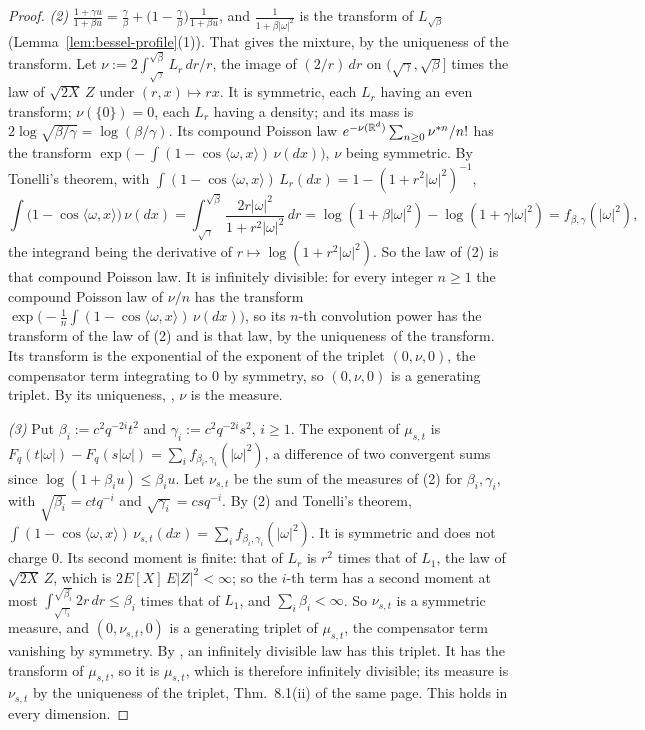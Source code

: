 \begin{proof}
\emph{(2)} $\frac{1 + \gamma u}{1 + \beta u} = \frac\gamma\beta + \bigl(1 - \frac\gamma\beta\bigr)
\frac{1}{1 + \beta u}$, and $\frac{1}{1 + \beta|\omega|^2}$ is the transform of $L_{\sqrt\beta}$
(Lemma~\ref{lem:bessel-profile}(1)). That gives the mixture, by the uniqueness of the transform.
Let $\nu := 2\int_{\sqrt\gamma}^{\sqrt\beta}L_r\,dr/r$, the image of $(2/r)\,dr$ on
$(\sqrt\gamma, \sqrt\beta]$ times the law of $\sqrt{2X}\,Z$ under $(r, x) \mapsto rx$. It is symmetric,
each $L_r$ having an even transform; $\nu(\{0\}) = 0$, each $L_r$ having a density; and its mass is
$2\log\sqrt{\beta/\gamma} = \log(\beta/\gamma)$. Its compound Poisson law
$e^{-\nu(\mathbb{R}^d)}\sum_{n \ge 0}\nu^{*n}/n!$ has the transform
$\exp\bigl(-\int(1 - \cos\langle\omega, x\rangle)\,\nu(dx)\bigr)$, $\nu$ being symmetric. By
Tonelli's theorem, with $\int(1 - \cos\langle\omega, x\rangle)\,L_r(dx) = 1 - (1 + r^2|\omega|^2)^{-1}$,
\[
  \int\bigl(1 - \cos\langle\omega, x\rangle\bigr)\,\nu(dx)
   = \int_{\sqrt\gamma}^{\sqrt\beta}\frac{2r|\omega|^2}{1 + r^2|\omega|^2}\,dr
   = \log(1 + \beta|\omega|^2) - \log(1 + \gamma|\omega|^2) = f_{\beta,\gamma}(|\omega|^2) ,
\]
the integrand being the derivative of $r \mapsto \log(1 + r^2|\omega|^2)$. So the law of (2) is that
compound Poisson law. It is infinitely divisible: for every integer $n \ge 1$ the compound Poisson
law of $\nu/n$ has the transform $\exp\bigl(-\tfrac1n\int(1 - \cos\langle\omega, x\rangle)\,
\nu(dx)\bigr)$, so its $n$-th convolution power has the transform of the law of (2) and is that
law, by the uniqueness of the transform. Its transform is the exponential of the exponent of the triplet $(0, \nu, 0)$,
the compensator term integrating to $0$ by symmetry, so $(0, \nu, 0)$ is a generating triplet. By
its uniqueness, , $\nu$ is the \Levy{}
measure.

\emph{(3)} Put $\beta_i := c^2q^{-2i}t^2$ and $\gamma_i := c^2q^{-2i}s^2$, $i \ge 1$. The exponent of
$\mu_{s,t}$ is $F_q(t|\omega|) - F_q(s|\omega|) = \sum_if_{\beta_i,\gamma_i}(|\omega|^2)$, a
difference of two convergent sums since $\log(1 + \beta_iu) \le \beta_iu$. Let $\nu_{s,t}$ be the
sum of the measures of (2) for $\beta_i, \gamma_i$, with $\sqrt{\beta_i} = ctq^{-i}$ and
$\sqrt{\gamma_i} = csq^{-i}$. By (2) and Tonelli's theorem,
$\int(1 - \cos\langle\omega, x\rangle)\,\nu_{s,t}(dx) = \sum_if_{\beta_i,\gamma_i}(|\omega|^2)$. It is
symmetric and does not charge $0$. Its second moment is finite: that of $L_r$ is $r^2$ times that of
$L_1$, the law of $\sqrt{2X}\,Z$, which is $2E[X]\,E|Z|^2 < \infty$; so the $i$-th term has a second
moment at most $\int_{\sqrt{\gamma_i}}^{\sqrt{\beta_i}}2r\,dr \le \beta_i$ times that of $L_1$, and
$\sum_i\beta_i < \infty$. So $\nu_{s,t}$ is a symmetric \Levy{} measure, and $(0, \nu_{s,t}, 0)$ is a
generating triplet of $\mu_{s,t}$, the compensator term vanishing by symmetry. By
, an infinitely divisible law has this
triplet. It has the transform of $\mu_{s,t}$, so it is $\mu_{s,t}$, which is therefore infinitely
divisible; its \Levy{} measure is $\nu_{s,t}$ by the uniqueness of the triplet, Thm.~8.1(ii) of the
same page. This holds in every dimension.


\end{proof}

